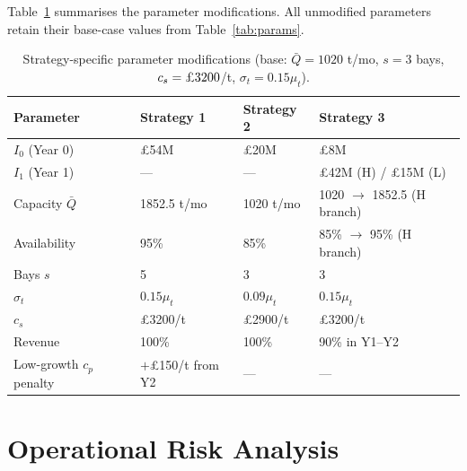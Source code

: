 \documentclass[10pt,a4paper]{article}
\begin{document}
Table~\ref{tab:strategy_params} summarises the parameter modifications. All unmodified parameters retain their base-case values from Table~\ref{tab:params}.

\begin{table}[H]
    \centering
    \caption{Strategy-specific parameter modifications (base: $\bar{Q} = 1020$ t/mo, $s = 3$ bays, $c_s = \text{\pounds}3200$/t, $\sigma_t = 0.15\mu_t$).}
    \label{tab:strategy_params}
    \small
    \begin{tabular}{@{}llll@{}}
        \toprule
        \textbf{Parameter}       & \textbf{Strategy 1}     & \textbf{Strategy 2} & \textbf{Strategy 3}             \\
        \midrule
        $I_0$ (Year 0)           & \pounds54M              & \pounds20M          & \pounds8M                       \\
        $I_1$ (Year 1)           & ---                     & ---                 & \pounds42M (H) / \pounds15M (L) \\
        Capacity $\bar{Q}$       & 1852.5 t/mo             & 1020 t/mo           & 1020 $\to$ 1852.5 (H branch)    \\
        Availability             & 95\%                    & 85\%                & 85\% $\to$ 95\% (H branch)      \\
        Bays $s$                 & 5                       & 3                   & 3                               \\
        $\sigma_t$               & $0.15\mu_t$             & $0.09\mu_t$         & $0.15\mu_t$                     \\
        $c_s$                    & \pounds3200/t           & \pounds2900/t       & \pounds3200/t                   \\
        Revenue                  & 100\%                   & 100\%               & 90\% in Y1--Y2                  \\
        Low-growth $c_p$ penalty & $+$\pounds150/t from Y2 & ---                 & ---                             \\
        \bottomrule
    \end{tabular}
\end{table}

\section{Operational Risk Analysis}
\label{sec:analysis}
\end{document}
